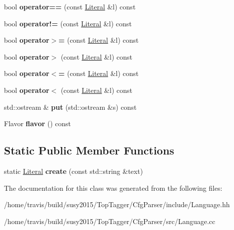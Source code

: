 \begin{DoxyCompactItemize}
\item 
\hypertarget{classcfg_1_1Literal_ab5cb98a8ac878c8423450e320a801112}{bool {\bfseries operator==} (const \hyperlink{classcfg_1_1Literal}{Literal} \&l) const }\label{classcfg_1_1Literal_ab5cb98a8ac878c8423450e320a801112}

\item 
\hypertarget{classcfg_1_1Literal_accd921f6cb74ac1a202c88a6c0d7aeb4}{bool {\bfseries operator!=} (const \hyperlink{classcfg_1_1Literal}{Literal} \&l) const }\label{classcfg_1_1Literal_accd921f6cb74ac1a202c88a6c0d7aeb4}

\item 
\hypertarget{classcfg_1_1Literal_acac105835f34a664c61bef95d9fd1c96}{bool {\bfseries operator$>$=} (const \hyperlink{classcfg_1_1Literal}{Literal} \&l) const }\label{classcfg_1_1Literal_acac105835f34a664c61bef95d9fd1c96}

\item 
\hypertarget{classcfg_1_1Literal_a332adf2898588150215e4f1dfdeefb34}{bool {\bfseries operator$>$} (const \hyperlink{classcfg_1_1Literal}{Literal} \&l) const }\label{classcfg_1_1Literal_a332adf2898588150215e4f1dfdeefb34}

\item 
\hypertarget{classcfg_1_1Literal_a8146b9f49a70689382758e79d5c5a03f}{bool {\bfseries operator$<$=} (const \hyperlink{classcfg_1_1Literal}{Literal} \&l) const }\label{classcfg_1_1Literal_a8146b9f49a70689382758e79d5c5a03f}

\item 
\hypertarget{classcfg_1_1Literal_a8526741de1be1a43dac0e36a2217f46d}{bool {\bfseries operator$<$} (const \hyperlink{classcfg_1_1Literal}{Literal} \&l) const }\label{classcfg_1_1Literal_a8526741de1be1a43dac0e36a2217f46d}

\item 
\hypertarget{classcfg_1_1Literal_acf0ad1e1bcdacd28689a6c639e93b6a7}{std\-::ostream \& {\bfseries put} (std\-::ostream \&s) const }\label{classcfg_1_1Literal_acf0ad1e1bcdacd28689a6c639e93b6a7}

\item 
\hypertarget{classcfg_1_1Literal_a9f547c4031a9ea611b074c2f0c76c2d4}{Flavor {\bfseries flavor} () const }\label{classcfg_1_1Literal_a9f547c4031a9ea611b074c2f0c76c2d4}

\end{DoxyCompactItemize}
\subsection*{Static Public Member Functions}
\begin{DoxyCompactItemize}
\item 
\hypertarget{classcfg_1_1Literal_afe057a53f78f422b16ea091538b73431}{static \hyperlink{classcfg_1_1Literal}{Literal} {\bfseries create} (const std\-::string \&text)}\label{classcfg_1_1Literal_afe057a53f78f422b16ea091538b73431}

\end{DoxyCompactItemize}


The documentation for this class was generated from the following files\-:\begin{DoxyCompactItemize}
\item 
/home/travis/build/susy2015/\-Top\-Tagger/\-Cfg\-Parser/include/Language.\-hh\item 
/home/travis/build/susy2015/\-Top\-Tagger/\-Cfg\-Parser/src/Language.\-cc\end{DoxyCompactItemize}
